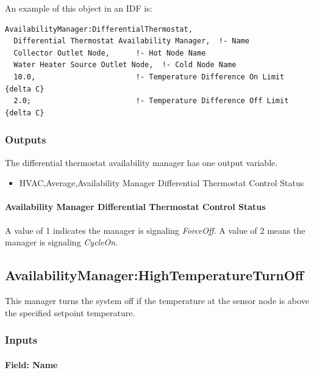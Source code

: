 An example of this object in an IDF is:

\begin{lstlisting}
AvailabilityManager:DifferentialThermostat,
  Differential Thermostat Availability Manager,  !- Name
  Collector Outlet Node,      !- Hot Node Name
  Water Heater Source Outlet Node,  !- Cold Node Name
  10.0,                       !- Temperature Difference On Limit {delta C}
  2.0;                        !- Temperature Difference Off Limit {delta C}
\end{lstlisting}

\subsubsection{Outputs}\label{outputs-3-020}

The differential thermostat availability manager has one output variable.

\begin{itemize}
\tightlist
\item
  HVAC,Average,Availability Manager Differential Thermostat Control Status
\end{itemize}

\paragraph{Availability Manager Differential Thermostat Control Status}\label{availability-manager-differential-thermostat-control-status}

A value of 1 indicates the manager is signaling \emph{ForceOff}. A value of 2 means the manager is signaling \emph{CycleOn}.

\subsection{AvailabilityManager:HighTemperatureTurnOff}\label{availabilitymanagerhightemperatureturnoff}

This manager turns the system off if the temperature at the sensor node is above the specified setpoint temperature.

\subsubsection{Inputs}\label{inputs-5-031}

\paragraph{Field: Name}\label{field-name-4-029}

